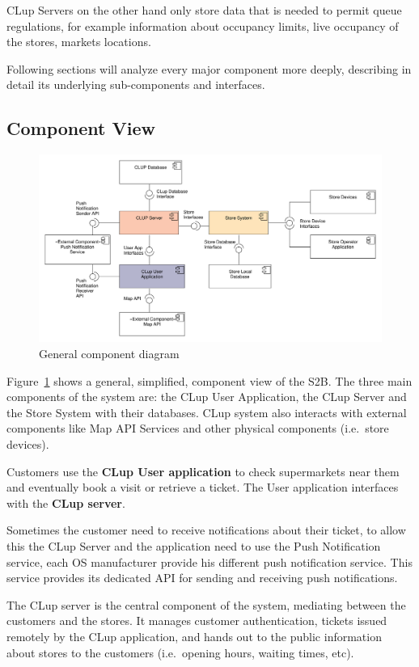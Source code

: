 CLup Servers on the other hand only store data that is needed to permit queue regulations, for example information about occupancy limits, live occupancy of the stores, markets locations.

Following sections will analyze every major component more deeply, describing in detail its underlying sub-components and interfaces.  

\subsection{Component View}
\begin{figure}[H]
    \includegraphics[width=\textwidth]{Images/UML_general_component.pdf}
    \caption{\label{fig:UML_comp_general}General component diagram}
\end{figure}
Figure~\ref{fig:UML_comp_general} shows a general, simplified, component view of the S2B.
The three main components of the system are: the CLup User Application, the CLup Server and the Store System with their databases. CLup system also interacts with external components like Map API Services and other physical components (i.e.~store devices).

Customers use the \textbf{CLup User application} to check supermarkets near them and eventually book a visit or retrieve a ticket. The User application interfaces with the \textbf{CLup server}. 

Sometimes the customer need to receive notifications about their ticket, to allow this the CLup Server and the application need to use the Push Notification service, each OS manufacturer provide his different push notification service. This service provides its dedicated API for sending and receiving push notifications.

The CLup server is the central component of the system, mediating between the customers and the stores. It manages customer authentication, tickets issued remotely by the CLup application, and hands out to the public information about stores to the customers (i.e.~opening hours, waiting times, etc). 

